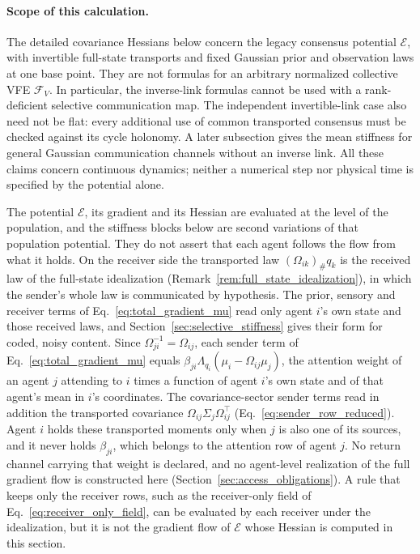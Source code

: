 \paragraph{Scope of this calculation.}
The detailed covariance Hessians below concern the legacy consensus potential $\mathcal E$, with invertible full-state transports and fixed Gaussian prior and observation laws at one base point. They are not formulas for an arbitrary normalized collective VFE $\mathcal F_V$. In particular, the inverse-link formulas cannot be used with a rank-deficient selective communication map. The independent invertible-link case also need not be flat: every additional use of common transported consensus must be checked against its cycle holonomy. A later subsection gives the mean stiffness for general Gaussian communication channels without an inverse link. All these claims concern continuous dynamics; neither a numerical step nor physical time is specified by the potential alone.

The potential $\mathcal E$, its gradient and its Hessian are evaluated at the level of the population, and the stiffness blocks below are second variations of that population potential. They do not assert that each agent follows the flow from what it holds. On the receiver side the transported law $(\Omega_{ik})_\#q_k$ is the received law of the full-state idealization (Remark~\ref{rem:full_state_idealization}), in which the sender's whole law is communicated by hypothesis. The prior, sensory and receiver terms of Eq.~\eqref{eq:total_gradient_mu} read only agent $i$'s own state and those received laws, and Section~\ref{sec:selective_stiffness} gives their form for coded, noisy content. Since $\Omega_{ji}^{-1}=\Omega_{ij}$, each sender term of Eq.~\eqref{eq:total_gradient_mu} equals $\beta_{ji}\Lambda_{q_i}(\mu_i-\Omega_{ij}\mu_j)$, the attention weight of an agent $j$ attending to $i$ times a function of agent $i$'s own state and of that agent's mean in $i$'s coordinates. The covariance-sector sender terms read in addition the transported covariance $\Omega_{ij}\Sigma_j\Omega_{ij}^\top$ (Eq.~\eqref{eq:sender_row_reduced}). Agent $i$ holds these transported moments only when $j$ is also one of its sources, and it never holds $\beta_{ji}$, which belongs to the attention row of agent $j$. No return channel carrying that weight is declared, and no agent-level realization of the full gradient flow is constructed here (Section~\ref{sec:access_obligations}). A rule that keeps only the receiver rows, such as the receiver-only field of Eq.~\eqref{eq:receiver_only_field}, can be evaluated by each receiver under the idealization, but it is not the gradient flow of $\mathcal E$ whose Hessian is computed in this section.

